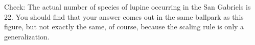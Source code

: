 Check: The actual number of species of lupine occurring in the San Gabriels
is 22. You should find that your answer comes out in the same ballpark as
this figure, but not exactly the same, of course, because the scaling rule is only
a generalization.



